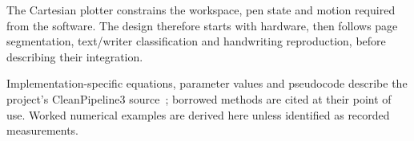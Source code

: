 \label{sec:design}
The Cartesian plotter constrains the workspace, pen state and motion required from the software. The design therefore starts with hardware, then follows page segmentation, text/writer classification and handwriting reproduction, before describing their integration.

Implementation-specific equations, parameter values and pseudocode describe the project's CleanPipeline3 source~\cite{braunepipeline2026}; borrowed methods are cited at their point of use. Worked numerical examples are derived here unless identified as recorded measurements.\par








